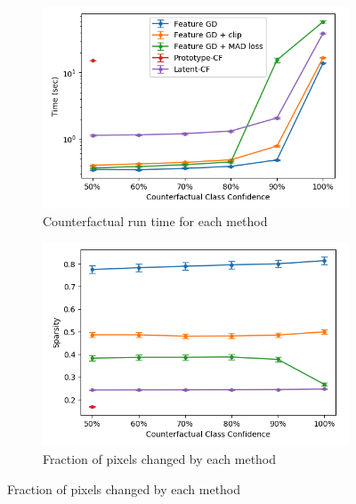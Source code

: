 \documentclass[letterpaper]{article} %
\begin{document}
\begin{figure}[hbt!]
    \centering
    \centering
    \begin{subfigure}{0.5\textwidth}
       \centering
        \includegraphics[width=0.9\linewidth]{figures/mnist/time.png}
        \caption{Counterfactual run time for each method}
        \label{fig:times}
    \end{subfigure}%
    \begin{subfigure}{0.5\textwidth}
      \centering
        \includegraphics[width=0.9\linewidth]{figures/mnist/sparsity.png}
        \caption{Fraction of pixels changed by each method}
        \label{fig:pixels}
    \end{subfigure}
    

\end{figure}
\end{document}
